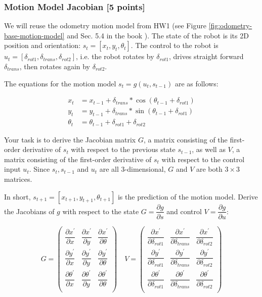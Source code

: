 \documentclass[tp]{lcc}
\begin{document}
\subsubsection{Motion Model Jacobian [5 points]}
We will reuse the odometry motion model from HW1 (see Figure \ref{fig:odometry-base-motion-model} and Sec. 5.4 in the book \cite{thrun2005probabilistic}). The state of the robot is its 2D position and orientation: $s_{t}=[x_{t},y_{t},\theta_{t}]$. The control to the robot is $u_{t}=[\delta_{rot1},\delta_{trans},\delta_{rot2}]$, i.e. the robot rotates by $\delta_{rot1}$, drives straight forward $\delta_{trans}$, then rotates again by $\delta_{rot2}$.

The equations for the motion model $s_{t}=g(u_{t},s_{t-1})$ are as follows:

\begin{align*}
    x_{t} &= x_{t-1}+\delta_{trans}*\cos(\theta_{t-1}+\delta_{rot1}) \\
    y_{t} &= y_{t-1}+\delta_{trans}*\sin(\theta_{t-1}+\delta_{rot1}) \\
    \theta_{t} &= \theta_{t-1}+\delta_{rot1}+\delta_{rot2}
\end{align*}

Your task is to derive the Jacobian matrix $G$, a matrix consisting of the first-order derivative of $s_{t}$ with respect to the previous state $s_{t-1}$, as well as $V$, a matrix consisting of the first-order derivative of $s_{t}$ with respect to the control input $u_{t}$. Since $s_{t},s_{t-1}$ and $u_{t}$ are all 3-dimensional, $G$ and $V$ are both $3\times 3$ matrices.

In short, $s_{t+1}=[x_{t+1},y_{t+1},\theta_{t+1}]$ is the prediction of the motion model. Derive the Jacobians of $g$ with respect to the state $G=\dfrac{\partial g}{\partial s}$ and control $V=\dfrac{\partial g}{\partial u}$:

\[
G=\begin{pmatrix}
\dfrac{\partial x^{\prime}}{\partial x} & \dfrac{\partial x^{\prime}}{\partial y} & \dfrac{\partial x^{\prime}}{\partial \theta} \\
\dfrac{\partial y^{\prime}}{\partial x} & \dfrac{\partial y^{\prime}}{\partial y} & \dfrac{\partial y^{\prime}}{\partial \theta} \\
\dfrac{\partial \theta^{\prime}}{\partial x} & \dfrac{\partial \theta^{\prime}}{\partial y} & \dfrac{\partial \theta^{\prime}}{\partial \theta} \\
\end{pmatrix}
\quad
V=\begin{pmatrix}
\dfrac{\partial x^{\prime}}{\partial \delta_{rot1}} & \dfrac{\partial x^{\prime}}{\partial \delta_{trans}} & \dfrac{\partial x^{\prime}}{\partial \delta_{rot2}} \\
\dfrac{\partial y^{\prime}}{\partial \delta_{rot1}} & \dfrac{\partial y^{\prime}}{\partial \delta_{trans}} & \dfrac{\partial y^{\prime}}{\partial \delta_{rot2}} \\
\dfrac{\partial \theta^{\prime}}{\partial \delta_{rot1}} & \dfrac{\partial \theta^{\prime}}{\partial \delta_{trans}} & \dfrac{\partial \theta^{\prime}}{\partial \delta_{rot2}} \\
\end{pmatrix}
\]
\end{document}
